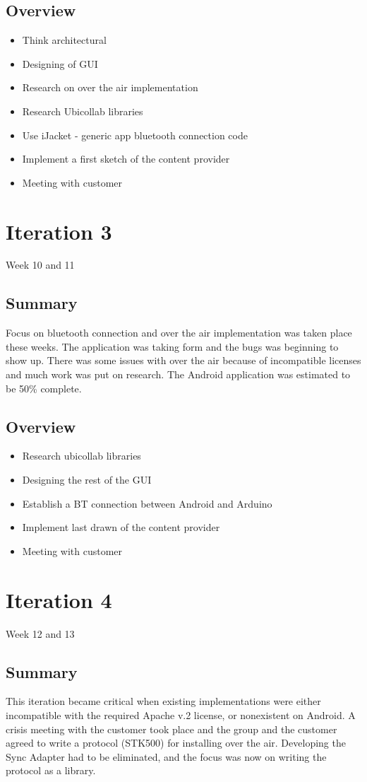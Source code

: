 \subsection{Overview}
\begin{itemize}
	\item{Think architectural}
	\item{Designing of GUI}
	\item{Research on over the air implementation}
	\item{Research Ubicollab libraries}
	\item{Use iJacket - generic app bluetooth connection code}
	\item{Implement a first sketch of the content provider}
	\item{Meeting with customer}
\end{itemize}

\section{Iteration 3}
Week 10 and 11
\subsection{Summary}
	Focus on bluetooth connection and over the air implementation was taken place these weeks. The application was taking form
	and the bugs was beginning to show up. There was some issues with over the air because of incompatible licenses and much work was
	put on research. The Android application was estimated to be 50\% complete.

\subsection{Overview}
\begin{itemize}
	\item{Research ubicollab libraries}
	\item{Designing the rest of the GUI}
	\item{Establish a BT connection between Android and Arduino}
	\item{Implement last drawn of the content provider}
	\item{Meeting with customer}
\end{itemize}

\section{Iteration 4}
Week 12 and 13
\subsection{Summary}
	This iteration became critical when existing implementations were either incompatible with the required Apache v.2 license, or nonexistent on Android.
	A crisis meeting with the customer took place and the group and the customer agreed to write
	a protocol (STK500) for installing over the air. Developing the Sync Adapter had to be eliminated, and the focus was now on writing the protocol as a library.

